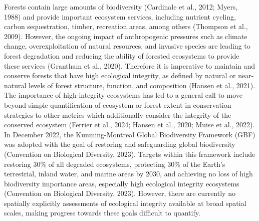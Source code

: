 \documentclass[
]{agujournal2019}
\begin{document}
Forests contain large amounts of biodiversity (Cardinale et al., 2012;
Myers, 1988) and provide important ecosystem services, including
nutrient cycling, carbon sequestration, timber, recreation areas, among
others (Thompson et al., 2009). However, the ongoing impact of
anthropogenic pressures such as climate change, overexploitation of
natural resources, and invasive species are leading to forest
degradation and reducing the ability of forested ecosystems to provide
these services (Grantham et al., 2020). Therefore it is imperative to
maintain and conserve forests that have high ecological integrity, as
defined by natural or near-natural levels of forest structure, function,
and composition (Hansen et al., 2021). The importance of high-integrity
ecosystems has led to a general call to move beyond simple
quantification of ecosystem or forest extent in conservation strategies
to other metrics which additionally consider the integrity of the
conserved ecosystem (Ferrier et al., 2024; Hansen et al., 2020; Muise et
al., 2022). In December 2022, the Kunming-Montreal Global Biodiversity
Framework (GBF) was adopted with the goal of restoring and safeguarding
global biodiversity (Convention on Biological Diversity, 2023). Targets
within this framework include restoring 30\% of all degraded ecosystems,
protecting 30\% of the Earth's terrestrial, inland water, and marine
areas by 2030, and achieving no loss of high biodiversity importance
areas, especially high ecological integrity ecosystems (Convention on
Biological Diversity, 2023). However, there are currently no spatially
explicitly assessments of ecological integrity available at broad
spatial scales, making progress towards these goals difficult to
quantify.
\end{document}

